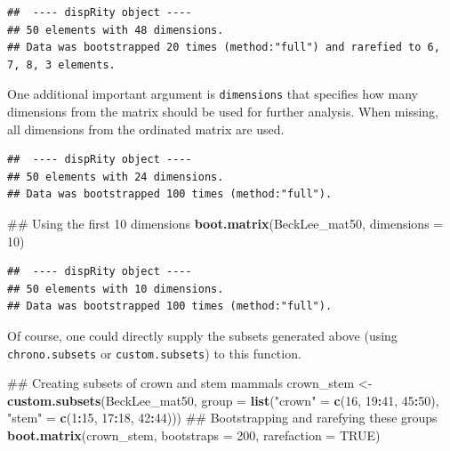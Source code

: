 \documentclass[]{book}
\newenvironment{Shaded}{\begin{snugshade}}{\end{snugshade}}
\newcommand{\KeywordTok}[1]{\textcolor[rgb]{0.13,0.29,0.53}{\textbf{#1}}}
\newcommand{\DataTypeTok}[1]{\textcolor[rgb]{0.13,0.29,0.53}{#1}}
\newcommand{\DecValTok}[1]{\textcolor[rgb]{0.00,0.00,0.81}{#1}}
\newcommand{\FloatTok}[1]{\textcolor[rgb]{0.00,0.00,0.81}{#1}}
\newcommand{\StringTok}[1]{\textcolor[rgb]{0.31,0.60,0.02}{#1}}
\newcommand{\OtherTok}[1]{\textcolor[rgb]{0.56,0.35,0.01}{#1}}
\newcommand{\OperatorTok}[1]{\textcolor[rgb]{0.81,0.36,0.00}{\textbf{#1}}}
\newcommand{\NormalTok}[1]{#1}
\theoremstyle{definition}
\theoremstyle{definition}
\theoremstyle{remark}
\begin{document}
\begin{verbatim}
##  ---- dispRity object ---- 
## 50 elements with 48 dimensions.
## Data was bootstrapped 20 times (method:"full") and rarefied to 6, 7, 8, 3 elements.
\end{verbatim}

One additional important argument is \texttt{dimensions} that specifies
how many dimensions from the matrix should be used for further analysis.
When missing, all dimensions from the ordinated matrix are used.

\begin{Shaded}
\end{Shaded}

\begin{verbatim}
##  ---- dispRity object ---- 
## 50 elements with 24 dimensions.
## Data was bootstrapped 100 times (method:"full").
\end{verbatim}

\begin{Shaded}
\begin{Highlighting}[]
\NormalTok{## Using the first 10 dimensions}
\KeywordTok{boot.matrix}\NormalTok{(BeckLee_mat50, }\DataTypeTok{dimensions =} \DecValTok{10}\NormalTok{)}
\end{Highlighting}
\end{Shaded}

\begin{verbatim}
##  ---- dispRity object ---- 
## 50 elements with 10 dimensions.
## Data was bootstrapped 100 times (method:"full").
\end{verbatim}

Of course, one could directly supply the subsets generated above (using
\texttt{chrono.subsets} or \texttt{custom.subsets}) to this function.

\begin{Shaded}
\begin{Highlighting}[]
\NormalTok{## Creating subsets of crown and stem mammals}
\NormalTok{crown_stem <-}\StringTok{ }\KeywordTok{custom.subsets}\NormalTok{(BeckLee_mat50,}
                                \DataTypeTok{group =} \KeywordTok{list}\NormalTok{(}\StringTok{"crown"}\NormalTok{ =}\StringTok{ }\KeywordTok{c}\NormalTok{(}\DecValTok{16}\NormalTok{, }\DecValTok{19}\OperatorTok{:}\DecValTok{41}\NormalTok{, }\DecValTok{45}\OperatorTok{:}\DecValTok{50}\NormalTok{), }
                                             \StringTok{"stem"}\NormalTok{ =}\StringTok{ }\KeywordTok{c}\NormalTok{(}\DecValTok{1}\OperatorTok{:}\DecValTok{15}\NormalTok{, }\DecValTok{17}\OperatorTok{:}\DecValTok{18}\NormalTok{, }\DecValTok{42}\OperatorTok{:}\DecValTok{44}\NormalTok{)))}
\NormalTok{## Bootstrapping and rarefying these groups}
\KeywordTok{boot.matrix}\NormalTok{(crown_stem, }\DataTypeTok{bootstraps =} \DecValTok{200}\NormalTok{, }\DataTypeTok{rarefaction =} \OtherTok{TRUE}\NormalTok{)}
\end{Highlighting}
\end{Shaded}
\end{document}
